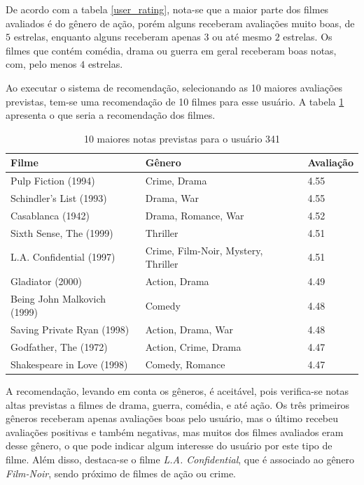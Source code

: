 \documentclass[12pt,a4paper,header]{abnt}
\begin{document}
De acordo com a tabela \ref{user_rating}, nota-se que a maior parte dos filmes avaliados é do gênero de ação, porém alguns receberam avaliações muito boas, de $5$ estrelas, enquanto alguns receberam apenas $3$ ou até mesmo $2$ estrelas. Os filmes que contém comédia, drama ou guerra em geral receberam boas notas, com, pelo menos $4$ estrelas.

Ao executar o sistema de recomendação, selecionando as 10 maiores avaliações previstas, tem-se uma recomendação de 10 filmes para esse usuário. A tabela \ref{recom_usuario} apresenta o que seria a recomendação dos filmes.

\begin{longtable}{@{}lll@{}}
\caption{10 maiores notas previstas para o usuário 341}
\label{recom_usuario}\\
\toprule
\textbf{Filme}              & \textbf{Gênero}                  & \textbf{Avaliação} \\* \midrule
\endhead
%
\bottomrule
\endfoot
%
\endlastfoot
%
Pulp Fiction (1994)         & Crime, Drama                      & 4.55               \\
Schindler's List (1993)     & Drama, War                        & 4.55               \\
Casablanca (1942)           & Drama, Romance, War                & 4.52               \\
Sixth Sense, The (1999)     & Thriller                         & 4.51               \\
L.A. Confidential (1997)    & Crime, Film-Noir, Mystery, Thriller & 4.51               \\
Gladiator (2000)            & Action, Drama                     & 4.49               \\
Being John Malkovich (1999) & Comedy                           & 4.48               \\
Saving Private Ryan (1998)  & Action, Drama, War                 & 4.48               \\
Godfather, The (1972)       & Action, Crime, Drama               & 4.47               \\
Shakespeare in Love (1998)  & Comedy, Romance                   & 4.47               \\* \bottomrule
\end{longtable}

A recomendação, levando em conta os gêneros, é aceitável, pois verifica-se notas altas previstas a filmes de drama, guerra, comédia, e até ação. Os três primeiros gêneros receberam apenas avaliações boas pelo usuário, mas o último recebeu avaliações positivas e também negativas, mas muitos dos filmes avaliados eram desse gênero, o que pode indicar algum interesse do usuário por este tipo de filme. Além disso, destaca-se o filme \textit{L.A. Confidential}, que é associado ao gênero \textit{Film-Noir}, sendo próximo de filmes de ação ou crime.
\end{document}
